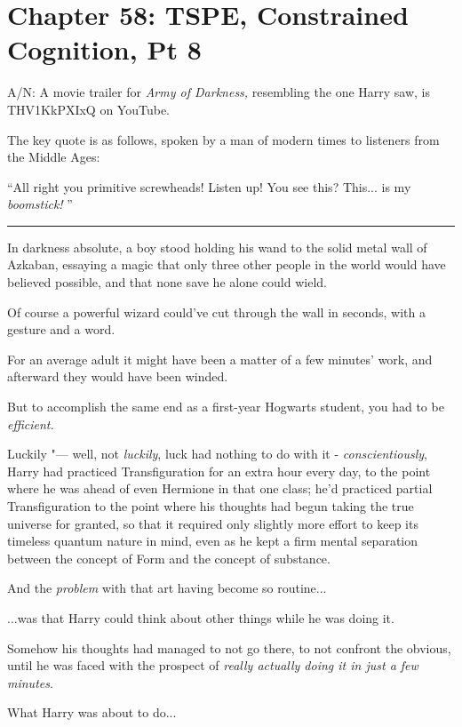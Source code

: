 \chapter{Chapter 58: TSPE, Constrained Cognition, Pt 8}
A/N: A movie trailer for \emph{Army of Darkness,} resembling the one
Harry saw, is THV1KkPXIxQ on YouTube.

The key quote is as follows, spoken by a man of modern times to
listeners from the Middle Ages:

``All right you primitive screwheads! Listen up! You see this?
This... is my \emph{boomstick!} ''

\begin{center}\rule{3in}{0.4pt}\end{center}

In darkness absolute, a boy stood holding his wand to the solid metal
wall of Azkaban, essaying a magic that only three other people in the
world would have believed possible, and that none save he alone could
wield.

Of course a powerful wizard could've cut through the wall in seconds,
with a gesture and a word.

For an average adult it might have been a matter of a few minutes' work,
and afterward they would have been winded.

But to accomplish the same end as a first-year Hogwarts student, you had
to be \emph{efficient.}

Luckily "--- well, not \emph{luckily}, luck had nothing to do with it -
\emph{conscientiously}, Harry had practiced Transfiguration for an extra
hour every day, to the point where he was ahead of even Hermione in that
one class; he'd practiced partial Transfiguration to the point where his
thoughts had begun taking the true universe for granted, so that it
required only slightly more effort to keep its timeless quantum nature
in mind, even as he kept a firm mental separation between the concept of
Form and the concept of substance.

And the \emph{problem} with that art having become so routine...

...was that Harry could think about other things while he was doing
it.

Somehow his thoughts had managed to not go there, to not confront the
obvious, until he was faced with the prospect of \emph{really actually
doing it in just a few minutes}.

What Harry was about to do...

